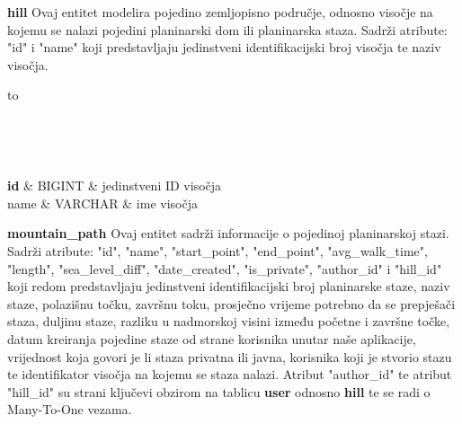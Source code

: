 				\textbf{hill} Ovaj entitet modelira pojedino zemljopisno područje, odnosno visočje na kojemu se nalazi pojedini planinarski dom ili planinarska staza. Sadrži atribute: "id" i "name" koji predstavljaju jedinstveni identifikacijski broj visočja te naziv visočja.
				
				\begin{longtabu} to \textwidth {|X[6, l]|X[6, l]|X[20, l]|}
					
					\hline {}	 \\[3pt] \hline
					\endfirsthead
					
					\hline {}	 \\[3pt] \hline
					\endhead
					
					\hline 
					\endlastfoot
					
					\textbf{id} & BIGINT	&  jedinstveni ID visočja 	\\ \hline
					name & VARCHAR	&  ime visočja 	\\ \hline
					
					
				\end{longtabu}
				\vspace{10mm}
			
			\textbf{mountain\_path} Ovaj entitet sadrži informacije o pojedinoj planinarskoj stazi. Sadrži atribute: "id", "name", "start\_point", "end\_point", "avg\_walk\_time", "length", "sea\_level\_diff", "date\_created", "is\_private", "author\_id" i "hill\_id" koji redom predstavljaju jedinstveni identifikacijski broj planinarske staze, naziv staze, polazišnu točku, završnu toku, prosječno vrijeme potrebno da se prepješači staza, duljinu staze, razliku u nadmorskoj visini između početne i završne točke, datum kreiranja pojedine staze od strane korisnika unutar naše aplikacije, vrijednost koja govori je li staza privatna ili javna, korisnika koji je stvorio stazu te identifikator visočja na kojemu se staza nalazi. Atribut "author\_id" te atribut "hill\_id" su strani ključevi obzirom na tablicu \textbf{user} odnosno \textbf{hill} te se radi o Many-To-One vezama.
			
